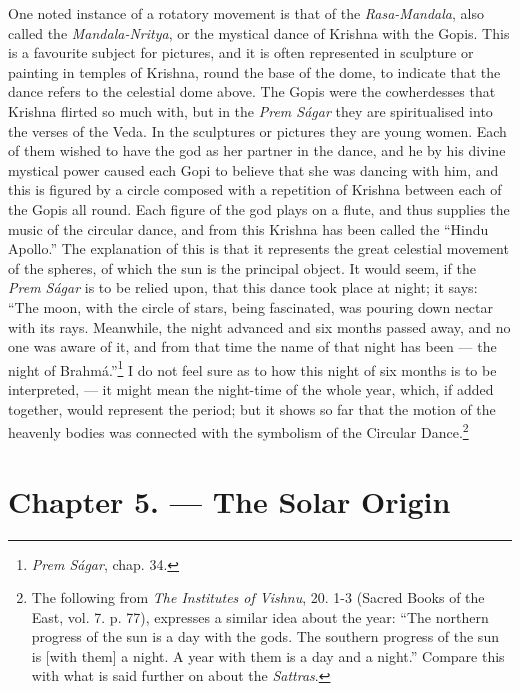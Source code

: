 \documentclass[a4paper, 11pt, oneside, polutonikogreek, english]{article}
\begin{document}
One noted instance of a rotatory movement is that of the \emph{Rasa-Mandala}, also called the \emph{Mandala-Nritya}, or the mystical dance of Krishna with the Gopis. This is a favourite subject for pictures, and it is often represented in sculpture or painting in temples of Krishna, round the base of the dome, to indicate that the dance refers to the celestial dome above. The Gopis were the cowherdesses that Krishna flirted so much with, but in the \emph{Prem Ságar} they are spiritualised into the verses of the Veda. In the sculptures or pictures they are young women. Each of them wished to have the god as her partner in the dance, and he by his divine mystical power caused each Gopi to believe that she was dancing with him, and this is figured by a circle composed with a repetition of Krishna between each of the Gopis all round. Each figure of the god plays on a flute, and thus supplies the music of the circular dance, and from this Krishna has been called the ``Hindu Apollo.'' The explanation of this is that it represents the great celestial movement of the spheres, of which the sun is the principal object. It would seem, if the \emph{Prem Ságar} is to be relied upon, that this dance took place at night; it says: ``The moon, with the circle of stars, being fascinated, was pouring down nectar with its rays. Meanwhile, the night advanced and six months passed away, and no one was aware of it, and from that time the name of that night has been --- the night of Brahmá.''\footnote{\emph{Prem Ságar}, chap. 34.} I do not feel sure as to how this night of six months is to be interpreted, --- it might mean the night-time of the whole year, which, if added together, would represent the period; but it shows so far that the motion of the heavenly bodies was connected with the symbolism of the Circular Dance.\footnote{The following from \emph{The Institutes of Vishnu}, 20. 1-3 (Sacred Books of the East, vol. 7. p. 77), expresses a similar idea about the year: ``The northern progress of the sun is a day with the gods. The southern progress of the sun is [with them] a night. A year with them is a day and a night.'' Compare this with what is said further on about the \emph{Sattras}.}
\clearpage
\section{Chapter 5. --- The Solar Origin}
\end{document}
